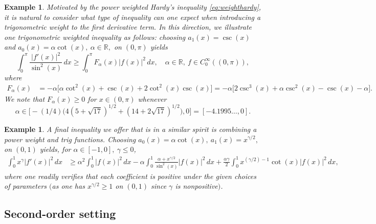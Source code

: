 \documentclass[reqno,10pt,centertags]{amsart}
\newcommand{\bbR}{{\mathbb{R}}}
\renewcommand{\a}{\alpha}
\newcommand{\g}{\gamma}
\newcommand{\lb}{\label}
\numberwithin{equation}{section}
\newtheorem{example}[theorem]{Example}
\theoremstyle{remark}
\begin{document}
\begin{example}
Motivated by the power weighted Hardy's inequality \eqref{eq:weighthardy}, it is natural to consider what type of inequality can one expect when introducing a trigonometric weight to the first derivative term. In this direction, we illustrate one trigonometric weighted inequality as follows: choosing $a_1(x)=\csc(x)$ and $a_0(x)=\a\cot(x),\ \a\in\bbR,$ on $(0,\pi)$ yields
\begin{equation}\label{eq:trigweight}
\int_{0}^{\pi} \frac{|f'(x)|^2}{\sin^2(x)}\, dx \geq \int_{0}^{\pi} F_\a(x)|f(x)|^2\, dx,\quad \a\in\bbR,\ f\in C^\infty_0((0,\pi)),
\end{equation}
where
\begin{align}
F_\a(x)&=-\a\big[\a\cot^2(x)+\csc(x)+2\cot^2(x)\csc(x)\big]=-\a\big[2\csc^3(x)+\a\csc^2(x)-\csc(x)-\a\big].
\end{align}
We note that $F_\a(x)\geq0$ for $x\in(0,\pi)$ whenever
\begin{equation}\label{range}
\a\in\big[-(1/4)\big(4(5+\sqrt{17})^{1/2}+(14+2\sqrt{17})^{1/2}\big),0\big]=[-4.1995\dots,0].
\end{equation}
\end{example}

\begin{example}
A final inequality we offer that is in a similar spirit is combining a power weight and trig functions. Choosing $a_0(x)=\a\cot(x),\ a_1(x)=x^{\g/2},$ on $(0,1)$ yields, for $\a\in[-1,0],\ \g\leq0$,
\begin{align}
\int_0^1 x^\g |f'(x)|^2\, dx & \geq \a^2\int_0^1 |f(x)|^2\, dx-\a\int_0^1 \frac{\a+x^{\g/2}}{\sin^2(x)}|f(x)|^2\, dx+\frac{\a\g}{2}\int_0^1 x^{(\g/2)-1} \cot (x) |f(x)|^2\, dx,
\end{align}
where one readily verifies that each coefficient is positive under the given choices of parameters $($as one has $x^{\g/2}\geq1$ on $(0,1)$ since $\g$ is nonpositive$)$.
\end{example}


\subsection{Second-order setting}\lb{s5.2}
\end{document}
